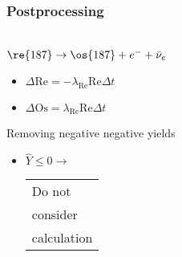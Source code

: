 \begin{frame}
  \frametitle{Postprocessing}
  \begin{minipage}[t][1cm][t]{0.45\linewidth}
    \betadecay \\ $\re{187} \rightarrow \os{187} + e^- + \bar{\nu}_e$
    \begin{itemize}
      \item $\Delta \mathrm{Re} = -\lambda_{\scriptscriptstyle \mathrm{Re}} \mathrm{Re} \Delta t$
      \item $\Delta \mathrm{Os} = \lambda_{\scriptscriptstyle \mathrm{Re}} \mathrm{Re} \Delta t$
    \end{itemize}
  \end{minipage}
  \hfill
  \begin{minipage}[t][1cm][t]{0.45\linewidth}
    Removing negative negative yields
    \begin{itemize}
      \item $\hat{Y} \leq 0 \rightarrow$ \begin{tabular}{l}Do not \\ consider \\ calculation \end{tabular}
    \end{itemize}
  \end{minipage}
\end{frame}

